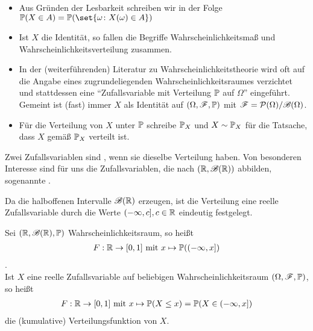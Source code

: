 \begin{*remark}
	\begin{itemize}
		\item Aus Gründen der Lesbarkeit schreiben wir in der Folge $\probp(X \in A) = \probp(\set{\omega \colon X(\omega) \in A})$
		\item Ist $X$ die Identität, so fallen die Begriffe Wahrscheinlichkeitsmaß und Wahrscheinlichkeitsverteilung zusammen.
		\item In der (weiterführenden) Literatur zu Wahrscheinlichkeitstheorie wird oft auf die Angabe eines zugrundeliegenden Wahrscheinlichkeitsraumes verzichtet und stattdessen eine ``Zufallsvariable mit Verteilung $\mathbb{P}$ auf $\Omega$'' eingeführt.
		Gemeint ist (fast) immer $X$ als Identität auf $(\Omega, \mathscr{F}, \mathbb{P})$ mit $\mathscr{F} = \mathcal{P}(\Omega) / \mathscr{B}(\Omega)$.
		\item Für die Verteilung von $X$ unter $\mathbb{P}$ schreibe $\mathbb{P}_{X}$ und $X \sim \mathbb{P}_{X}$ für die Tatsache, dass $X$ gemäß $\mathbb{P}_{X}$ verteilt ist.
	\end{itemize}
\end{*remark}

\begin{definition}
	Zwei Zufallsvariablen sind , wenn sie dieselbe Verteilung haben.
	Von besonderen Interesse sind für uns die Zufallsvariablen, die nach $(\mathbb{R}, \mathscr{B}(\mathbb{R}))$ abbilden, sogenannte .
\end{definition}

Da die halboffenen Intervalle $\mathscr{B}(\mathbb{R})$ erzeugen, ist die Verteilung eine reelle Zufallsvariable durch die Werte $(-\infty, c], c \in \mathbb{R}$ eindeutig festgelegt.

\begin{definition}
	Sei $(\mathbb{R}, \mathscr{B}(\mathbb{R}), \mathbb{P})$ Wahrscheinlichkeitsraum, so heißt
	\begin{align}
		F: \mathbb{R} \to [0,1] \text{ mit } x \mapsto \mathbb{P}((-\infty, x]) \notag
	\end{align}
	.\\
	Ist $X$ eine reelle Zufallsvariable auf beliebigen Wahrscheinlichkeitsraum $(\Omega, \mathscr{F}, \mathbb{P})$, so heißt
	\begin{align}
		F: \mathbb{R} \to [0,1] \text{ mit } x \mapsto \mathbb{P}(X \le x) = \mathbb{P}(X \in (-\infty, x]) \notag
	\end{align} %
	die (kumulative) Verteilungsfunktion von $X$.
\end{definition}

